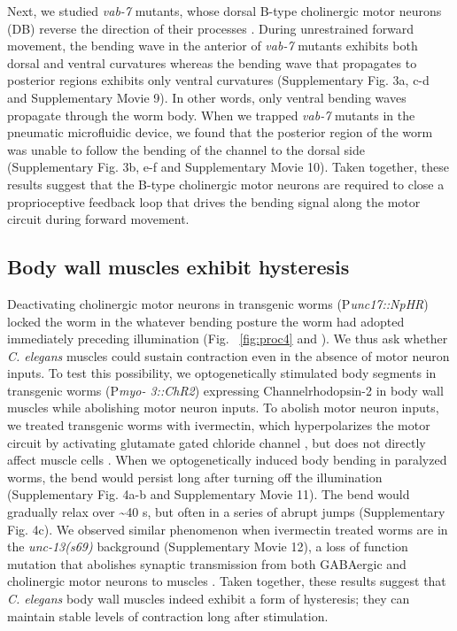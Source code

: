 Next, we studied \textit{vab-7} mutants, whose dorsal B-type cholinergic motor neurons (DB) reverse 
the direction of their processes \citep{esmaeili_c._2002}. During unrestrained forward movement, the bending wave 
in the anterior of \textit{vab-7} mutants exhibits both dorsal and ventral curvatures whereas the bending 
wave that propagates to posterior regions exhibits only ventral curvatures (Supplementary Fig. 
3a, c-d and Supplementary Movie 9). In other words, only ventral bending waves propagate 
through the worm body. When we trapped \textit{vab-7} mutants in the pneumatic microfluidic device, 
we found that the posterior region of the worm was unable to follow the bending of the channel 
to the dorsal side (Supplementary Fig. 3b, e-f and Supplementary Movie 10). Taken together, 
these results suggest that the B-type cholinergic motor neurons are required to close a 
proprioceptive feedback loop that drives the bending signal along the motor circuit during 
forward movement. 


\subsection{Body wall muscles exhibit hysteresis}
 
Deactivating cholinergic motor neurons in transgenic worms (P\textit{unc17::NpHR}) locked the worm 
in the whatever bending posture the worm had adopted immediately preceding illumination (Fig. ~\ref{fig:proc4} and  \citep{leifer_optogenetic_2011}). We thus ask 
whether \textit{C. elegans} muscles could sustain contraction even in the absence of motor neuron inputs. 
To test this possibility, we optogenetically stimulated body segments in transgenic worms (P\textit{myo- 3::ChR2}) expressing Channelrhodopsin-2 in body wall muscles while abolishing motor neuron 
inputs. To abolish motor neuron inputs, we treated transgenic worms with ivermectin, which 
hyperpolarizes the motor circuit by activating glutamate gated chloride channel \citep{dent_genetics_2000,cully_cloning_1994}, but 
does not directly affect muscle cells \citep{hart_behavior_2006}. When we optogenetically induced body bending in 
paralyzed worms, the bend would persist long after turning off the illumination (Supplementary 
Fig. 4a-b and Supplementary Movie 11). The bend would gradually relax over \textasciitilde40 s, but often in 
a series of abrupt jumps (Supplementary Fig. 4c). We observed similar phenomenon when 
ivermectin treated worms are in the \textit{unc-13(s69)} background (Supplementary Movie 12), a loss 
of function mutation that abolishes synaptic transmission from both GABAergic and cholinergic 
motor neurons to muscles \citep{richmond_unc-13_1999}. Taken together, these results suggest that \textit{C. elegans} body wall 
muscles indeed exhibit a form of hysteresis; they can maintain stable levels of contraction long after stimulation.  

